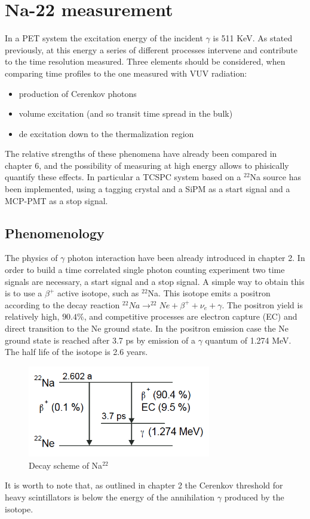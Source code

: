 \chapter{Na-22 measurement}

In a PET system the excitation energy of the incident $\gamma$ is 511 KeV. As stated previously, at this energy a series of different processes intervene and contribute to the time resolution measured.
Three elements should be considered, when comparing time profiles to the one measured with VUV radiation:
\begin{itemize}
\item production of Cerenkov photons
\item volume excitation (and so transit time spread in the bulk)
\item de excitation down to the thermalization region
\end{itemize}
The relative strengths of these phenomena have already been compared in chapter 6, and the possibility of measuring at high energy allows to phisically quantify these effects.
In particular a TCSPC system based on a $^{22}$Na source has been implemented, using a tagging crystal and a SiPM as a start signal and a MCP-PMT as a stop signal. 

\section{Phenomenology}

The physics of $\gamma$ photon interaction have been already introduced in chapter 2.
In order to build a time correlated single photon counting experiment two time signals are necessary, a start signal and a stop signal.
A simple way to obtain this is to use a $\beta ^{+}$ active isotope, such as $^{22}$Na. This isotope emits a positron according to the decay reaction $^{22}Na \rightarrow ^{22}Ne + \beta ^{+} + \nu _{e} + \gamma$. The positron yield is relatively high, $90.4\%$, and competitive processes are electron capture (EC) and direct transition to the Ne ground state. 
In the positron emission case the Ne ground state is reached after 3.7 ps by emission of a $\gamma$ quantum of 1.274 MeV. The half life of the isotope is 2.6 years.
\begin{figure}[htbp]
\begin{center}
\includegraphics[width=8cm]{../Pictures/Chapter_8/Na-22}
\end{center}
\caption[Na$^{22}$ decay scheme]{Decay scheme of Na$^{22}$}
\label{fig:Na_22}
\end{figure}
It is worth to note that, as outlined in chapter 2 the Cerenkov threshold for heavy scintillators is below the energy of the annihilation $\gamma$ produced by the isotope.


